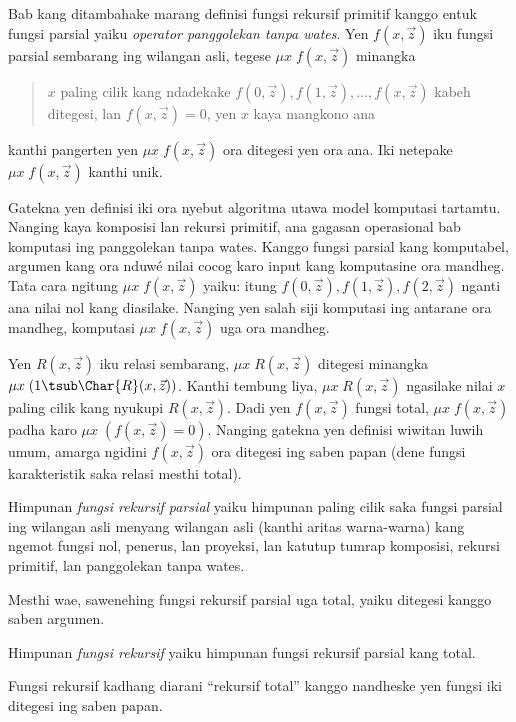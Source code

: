 \documentclass[../../../include/open-logic-section]{subfiles}
\begin{document}
Bab kang ditambahake marang definisi fungsi
rekursif primitif kanggo entuk fungsi parsial
yaiku \emph{operator panggolekan tanpa wates}.
Yen $f(x,\vec z)$ iku fungsi parsial sembarang
ing wilangan asli, tegese $\mu x \; f(x,\vec z)$
minangka
\begin{quote}
  $x$ paling cilik kang ndadekake
  $f(0,\vec z), f(1,\vec z), \dots, f(x,\vec
  z)$ kabeh ditegesi, lan $f(x,\vec z) = 0$,
  yen $x$ kaya mangkono ana
\end{quote}
kanthi pangerten yen $\mu x \; f(x,\vec z)$
ora ditegesi yen ora ana. Iki netepake
$\mu x \; f(x,\vec z)$ kanthi unik.

\begin{explain}
Gatekna yen definisi iki ora nyebut
 algoritma
utawa model komputasi tartamtu. Nanging
kaya komposisi lan rekursi primitif, ana
gagasan operasional bab komputasi ing
panggolekan tanpa wates. Kanggo fungsi
parsial kang komputabel, argumen kang
ora nduwé nilai cocog karo input kang
komputasine ora mandheg. Tata cara
ngitung $\mu x \; f(x,\vec z)$ yaiku:
itung $f(0,\vec z), f(1,\vec z),
f(2,\vec z)$ nganti ana nilai nol
kang diasilake. Nanging yen salah siji
komputasi ing antarane ora mandheg,
komputasi $\mu x \; f(x,\vec z)$
uga ora mandheg.
\end{explain}

Yen $R(x,\vec z)$ iku relasi sembarang,
$\mu x \; R(x,\vec z)$ ditegesi minangka
$\mu x \; (1 \tsub \Char{R}(x,\vec z))$.
Kanthi tembung liya, $\mu x \;
R(x,\vec z)$ ngasilake nilai $x$ paling
cilik kang nyukupi $R(x,\vec z)$.
Dadi yen $f(x,\vec z)$ fungsi total,
$\mu x \; f(x,\vec z)$ padha karo
$\mu x \; (f(x,\vec z) = 0)$.
Nanging gatekna yen definisi wiwitan
luwih umum, amarga ngidini $f(x,\vec z)$
ora ditegesi ing saben papan (dene
fungsi karakteristik saka relasi
mesthi total).

\begin{defn}
Himpunan \emph{fungsi rekursif parsial}
yaiku himpunan paling cilik saka fungsi
parsial ing wilangan asli menyang
wilangan asli (kanthi aritas warna-warna)
kang ngemot fungsi nol, penerus, lan
proyeksi, lan katutup tumrap komposisi,
rekursi primitif, lan panggolekan tanpa wates.
\end{defn}

Mesthi wae, sawenehing fungsi rekursif parsial
uga total, yaiku ditegesi kanggo saben argumen.

\begin{defn}
Himpunan \emph{fungsi rekursif} yaiku
himpunan fungsi rekursif parsial kang total.
\end{defn}

Fungsi rekursif kadhang diarani
``rekursif total'' kanggo nandheske yen
fungsi iki ditegesi ing saben papan.
\end{document}
